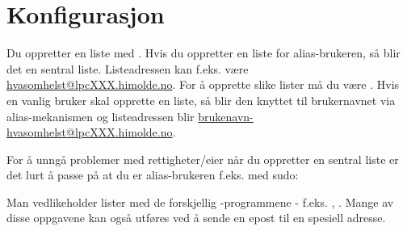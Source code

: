 \iffalse

\subsection{Manuell installasjon av ezmlm}

For å finne filen gikk jeg til \url{https://packages.debian.org/ezmlm-idx} og havnet
til slutt på \url{https://packages.debian.org/experimental/i386/ezmlm-idx/download}. 
Selve installasjonen blir da:

\cmd{wget http://ftp.no.debian.org/debian/pool/main/e/ezmlm-idx/ezmlm-idx_7.1.1-1~exp0+b1_i386.deb}
\cmd{dpkg -i ezmlm-idx_7.1.1-1~exp0+b1_i386.deb}

\fi


\section{Konfigurasjon}

Du oppretter en liste med . Hvis du oppretter en liste for 
alias-brukeren, så blir det en sentral liste. Listeadressen kan f.eks. 
være \url{hvasomhelst@lpcXXX.himolde.no}. For å opprette slike 
lister må du være . Hvis en vanlig bruker skal opprette en liste, 
så blir den knyttet til brukernavnet via alias-mekanismen og listeadressen blir 
\url{brukenavn-hvasomhelst@lpcXXX.himolde.no}.

\begin{remark}
For å unngå problemer med rettigheter/eier når du oppretter en sentral
liste er det lurt å passe på at du er alias-brukeren f.eks. med sudo:

\end{remark}

Man vedlikeholder lister med de forskjellig -programmene - 
f.eks. , .
Mange av disse oppgavene kan også utføres ved å sende en epost til
en spesiell adresse.
